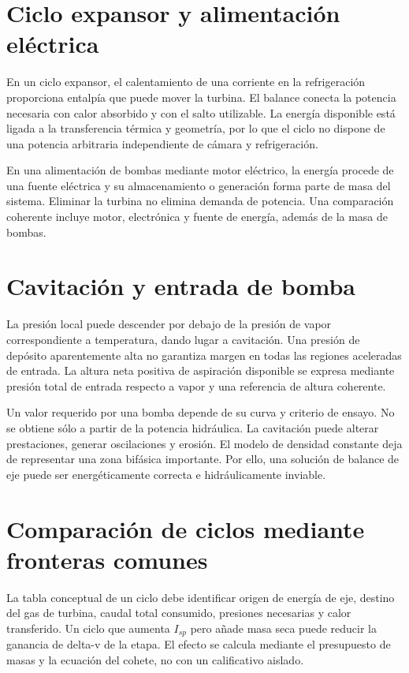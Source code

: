 \section{Ciclo expansor y alimentación eléctrica}
En un ciclo expansor, el calentamiento de una corriente en la refrigeración proporciona entalpía que puede mover la turbina. El balance conecta la potencia necesaria con calor absorbido y con el salto utilizable. La energía disponible está ligada a la transferencia térmica y geometría, por lo que el ciclo no dispone de una potencia arbitraria independiente de cámara y refrigeración.

En una alimentación de bombas mediante motor eléctrico, la energía procede de una fuente eléctrica y su almacenamiento o generación forma parte de masa del sistema. Eliminar la turbina no elimina demanda de potencia. Una comparación coherente incluye motor, electrónica y fuente de energía, además de la masa de bombas.
\section{Cavitación y entrada de bomba}
La presión local puede descender por debajo de la presión de vapor correspondiente a temperatura, dando lugar a cavitación. Una presión de depósito aparentemente alta no garantiza margen en todas las regiones aceleradas de entrada. La altura neta positiva de aspiración disponible se expresa mediante presión total de entrada respecto a vapor y una referencia de altura coherente.

Un valor requerido por una bomba depende de su curva y criterio de ensayo. No se obtiene sólo a partir de la potencia hidráulica. La cavitación puede alterar prestaciones, generar oscilaciones y erosión. El modelo de densidad constante deja de representar una zona bifásica importante. Por ello, una solución de balance de eje puede ser energéticamente correcta e hidráulicamente inviable.\cite{MIT26}
\section{Comparación de ciclos mediante fronteras comunes}
La tabla conceptual de un ciclo debe identificar origen de energía de eje, destino del gas de turbina, caudal total consumido, presiones necesarias y calor transferido. Un ciclo que aumenta $I_{sp}$ pero añade masa seca puede reducir la ganancia de delta-v de la etapa. El efecto se calcula mediante el presupuesto de masas y la ecuación del cohete, no con un calificativo aislado.

